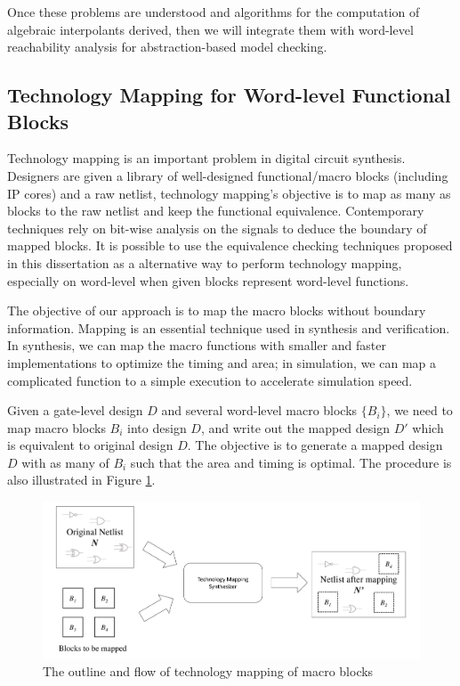 Once these problems are understood and algorithms for the computation
of algebraic interpolants derived, then we will integrate them 
with word-level reachability analysis for abstraction-based model
checking. 

\subsection{Technology Mapping for Word-level Functional Blocks}
Technology mapping is an important problem in digital circuit synthesis.
Designers are given a library of well-designed functional/macro blocks (including IP cores) and a raw netlist, 
technology mapping's objective is to map as many as blocks to the raw netlist and 
keep the functional equivalence. Contemporary techniques rely on bit-wise 
analysis on the signals to deduce the boundary of mapped blocks.
It is possible to use the equivalence checking techniques proposed in this dissertation 
as a alternative way to perform technology mapping, especially on word-level when 
given blocks represent word-level functions.

\begin{Problem}
The objective of our approach is to map the macro blocks without boundary information.
Mapping is an essential technique used in synthesis and verification. In synthesis, we can map the 
macro functions with smaller and faster implementations to optimize the timing and area; in simulation,
we can map a complicated function to a simple execution to accelerate simulation speed.

Given a gate-level design $D$ and several word-level macro blocks $\{B_i\}$, we need to map macro
blocks $B_i$ into design $D$, and write out the mapped design $D'$ which is equivalent to original
design $D$. The objective is to generate a mapped design $D$ with as many of $B_i$ such that the area
and timing is optimal. The procedure is also illustrated in Figure \ref{fig:macro}.

\begin{figure}[h]
	\begin{center}
	\includegraphics[width=\textwidth]{newfig/macro.pdf}
	\end{center}
	\caption{The outline and flow of technology mapping of macro blocks}
	\label{fig:macro}
\end{figure}

\end{Problem}

